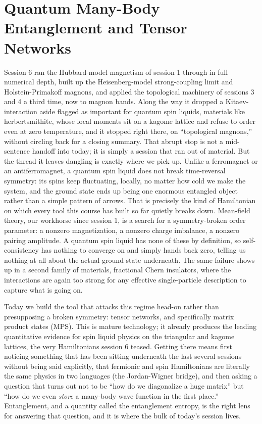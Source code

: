 \chapter{Quantum Many-Body Entanglement and Tensor Networks}

Session 6 ran the Hubbard-model magnetism of session 1 through in full numerical depth, built up the
Heisenberg-model strong-coupling limit and Holstein-Primakoff magnons, and applied the topological
machinery of sessions 3 and 4 a third time, now to magnon bands. Along the way it dropped a Kitaev-
interaction aside flagged as important for quantum spin liquids, materials like herbertsmithite,
whose local moments sit on a kagome lattice and refuse to order even at zero temperature, and it
stopped right there, on ``topological magnons,'' without circling back for a closing summary. That
abrupt stop is not a mid-sentence handoff into today; it is simply a session that ran out of material.
But the thread it leaves dangling is exactly where we pick up. Unlike a ferromagnet or an
antiferromagnet, a quantum spin liquid does not break time-reversal symmetry: its spins keep
fluctuating, locally, no matter how cold we make the system, and the ground state ends up being one
enormous entangled object rather than a simple pattern of arrows. That is precisely the kind of
Hamiltonian on which every tool this course has built so far quietly breaks down. Mean-field theory,
our workhorse since session 1, is a search for a symmetry-broken order parameter: a nonzero
magnetization, a nonzero charge imbalance, a nonzero pairing amplitude. A quantum spin liquid has none
of these by definition, so self-consistency has nothing to converge on and simply hands back zero,
telling us nothing at all about the actual ground state underneath. The same failure shows up in a
second family of materials, fractional Chern insulators, where the interactions are again too strong
for any effective single-particle description to capture what is going on.

Today we build the tool that attacks this regime head-on rather than presupposing a broken symmetry:
tensor networks, and specifically matrix product states (MPS). This is mature technology; it already
produces the leading quantitative evidence for spin liquid physics on the triangular and kagome
lattices, the very Hamiltonians session 6 teased. Getting there means first noticing something that
has been sitting underneath the last several sessions without being said explicitly, that fermionic
and spin Hamiltonians are literally the same physics in two languages (the Jordan-Wigner bridge), and
then asking a question that turns out not to be ``how do we diagonalize a huge matrix'' but ``how do we
even \emph{store} a many-body wave function in the first place.'' Entanglement, and a quantity called the
entanglement entropy, is the right lens for answering that question, and it is where the bulk of
today's session lives.

